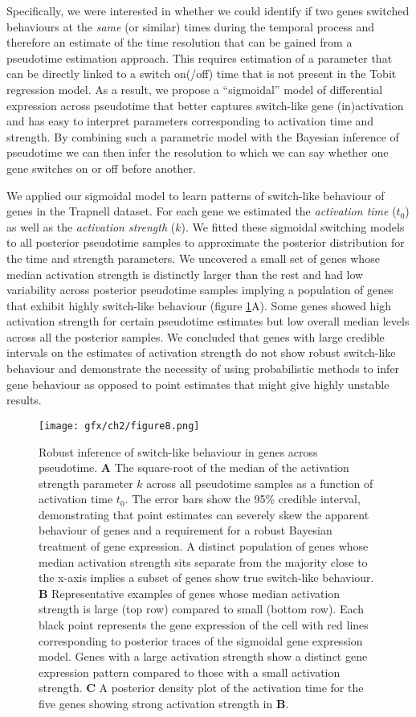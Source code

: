 Specifically, we were interested in whether we could identify if two genes switched behaviours at the \emph{same} (or similar) times during the temporal process and therefore an estimate of the time resolution that can be gained from a pseudotime estimation approach. This requires estimation of a parameter that can be directly linked to a switch on(/off) time that is not present in the Tobit regression model. As a result, we propose a ``sigmoidal'' model of differential expression across pseudotime that better captures switch-like gene (in)activation and has easy to interpret parameters corresponding to activation time and strength. By combining such a parametric model with the Bayesian inference of pseudotime we can then infer the resolution to which we can say whether one gene switches on or off before another.

We applied our sigmoidal model to learn patterns of switch-like behaviour of genes in the Trapnell dataset. For each gene we estimated the \emph{activation time} ($t_0$) as well as the \emph{activation strength} ($k$). We fitted these sigmoidal switching models to all posterior pseudotime samples to approximate the posterior distribution for the time and strength parameters. We uncovered a small set of genes whose median activation strength is distinctly larger than the rest and had low variability across posterior pseudotime samples implying a population of genes that exhibit highly switch-like behaviour (figure \ref{fig:switchres}A). Some genes showed high activation strength for certain pseudotime estimates but low overall median levels across all the posterior samples. We concluded that genes with large credible intervals on the estimates of activation strength do not show robust switch-like behaviour and demonstrate the necessity of using probabilistic methods to infer gene behaviour as opposed to point estimates that might give highly unstable results.

\begin{figure}
\centering
	\texttt{[image: gfx/ch2/figure8.png]}
\caption{ Robust inference of switch-like behaviour in genes across pseudotime.
\textbf{A} The square-root of the median of the activation strength parameter $k$ across all pseudotime samples as a function of activation time $t_0$. The error bars show the 95\% credible interval, demonstrating that point estimates can severely skew the apparent behaviour of genes and a requirement for a robust Bayesian treatment of gene expression. A distinct population of genes whose median activation strength sits separate from the majority close to the x-axis implies a subset of genes show true switch-like behaviour. \textbf{B} Representative examples of genes whose median activation strength is large (top row) compared to small (bottom row). Each black point represents the gene expression of the cell with red lines corresponding to posterior traces of the sigmoidal gene expression model. Genes with a large activation strength show a distinct gene expression pattern compared to those with a small activation strength. \textbf{C} A posterior density plot of the activation time for the five genes showing strong activation strength in \textbf{B}.} \label{fig:switchres}
\end{figure}

